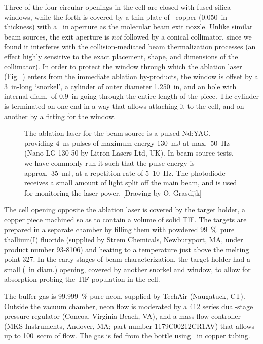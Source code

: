 Three of the four circular openings in the cell are closed with fused silica
windows, while the forth is covered by a thin plate of \OFHC\ copper (0.050~in
thickness) with a ~in aperture as the molecular beam exit nozzle.
Unlike similar beam sources, the exit aperture is \emph{not} followed by a
conical collimator, since we found it interferes with the collision-mediated
beam thermalization processes (an effect highly sensitive to the exact
placement, shape, and dimensions of the collimator). In order to protect the
window through which the ablation laser (Fig.~) enters from
the immediate ablation by-products, the window is offset by a 3~in-long
`snorkel', a cylinder of outer diameter 1.250~in, and an hole with internal
diam.\ of 0.9~in going through the entire length of the piece. The cylinder is
terminated on one end in a way that allows attaching it to the cell, and on
another by a fitting for the window.

\begin{figure}
    \centering
    \def\svgwidth{1\columnwidth}
    
    \caption[Ablation laser system.]{The ablation laser for the beam source is a
    pulsed Nd:YAG, providing 4~ns pulses of maximum energy 130~mJ at max.\
    50~Hz (Nano LG 130-50 by Litron Lasers Ltd, UK). In beam source tests, we
    have commonly run it such that the pulse energy is approx.\ 35~mJ, at a
    repetition rate of 5--10~Hz. The photodiode receives a small amount of light
    split off the main beam, and is used for monitoring the laser power.
    [Drawing by O. Grasdijk]}
    \label{ablationLaser}
\end{figure}

The cell opening opposite the ablation laser is covered by the target holder, a
copper piece machined so as to contain a volume of solid TlF. The targets are
prepared in a separate chamber by filling them with powdered 99~\%\ pure
thallium(I) fluoride (supplied by Strem Chemicals, Newburyport, MA, under
product number 93-8106) and heating to a temperature just above the melting
point 327\degC. In the early stages of beam characterization, the target holder
had a small (\nicefrac{1}{4}~in diam.) opening, covered by another snorkel and
window, to allow for absorption probing the TlF population in the cell.

The buffer gas is 99.999~\% pure neon, supplied by TechAir (Naugatuck, CT).
Outside the vacuum chamber, neon flow is moderated by a 412 series dual-stage
pressure regulator (Concoa, Virginia Beach, VA), and a mass-flow controller (MKS
Instruments, Andover, MA; part number 1179C00212CR1AV) that allows up to
100~sccm of flow. The gas is fed from the bottle using \nicefrac{1}{4}~in copper
tubing.

